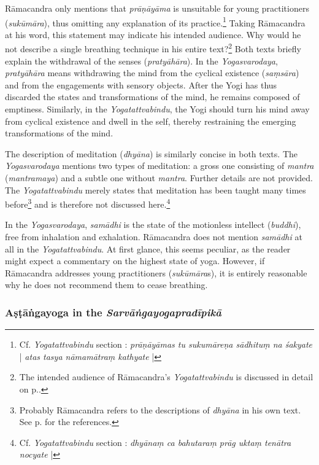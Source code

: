 Rāmacandra only mentions that \textit{prāṇāyāma} is unsuitable for young practitioners (\textit{sukūmāra}), thus omitting any explanation of its practice.\footnote{Cf. \textit{Yogatattvabindu} section : \textit{prāṇāyāmas tu sukumāreṇa sādhituṃ na śakyate} | \textit{atas tasya nāmamātraṃ kathyate} |} Taking Rāmacandra at his word, this statement may indicate his intended audience. Why would he not describe a single breathing technique in his entire text?\footnote{The intended audience of Rāmacandra's \textit{Yogatattvabindu} is discussed in detail on p.\pageref{ytbaudience}.}
Both texts briefly explain the withdrawal of the senses (\textit{pratyāhāra}). In the \textit{Yogasvarodaya}, \textit{pratyāhāra} means withdrawing the mind from the cyclical existence (\textit{saṃsāra}) and from the engagements with sensory objects. After the Yogi has thus discarded the states and transformations of the mind, he remains composed of emptiness. Similarly, in the \textit{Yogatattvabindu}, the Yogi should turn his mind away from cyclical existence and dwell in the self, thereby restraining the emerging transformations of the mind.

The description of meditation (\textit{dhyāna}) is similarly concise in both texts. The \textit{Yogasvarodaya} mentions two types of meditation: a gross one consisting of \textit{mantra} (\textit{mantramaya}) and a subtle one without \textit{mantra}. Further details are not provided. The \textit{Yogatattvabindu} merely states that meditation has been taught many times before\footnote{Probably Rāmacandra refers to the descriptions of \emph{dhyāna} in his own text. See p. \pageref{ramacandradhyana} for the references.} and is therefore not discussed here.\footnote{Cf. \textit{Yogatattvabindu} section : \textit{dhyānaṃ ca bahutaraṃ prāg uktaṃ tenātra nocyate} |}

In the \textit{Yogasvarodaya}, \textit{samādhi} is the state of the motionless intellect (\textit{buddhi}), free from inhalation and exhalation. Rāmacandra does not mention \textit{samādhi} at all in the \textit{Yogatattvabindu}. At first glance, this seems peculiar, as the reader might expect a commentary on the highest state of yoga. However, if Rāmacandra addresses young practitioners (\textit{sukūmāra}s), it is entirely reasonable why he does not recommend them to cease breathing.

\subsubsection{Aṣṭāṅgayoga in the \textit{Sarvāṅgayogapradīpikā}}

